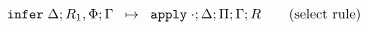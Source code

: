 
\[
\mathtt{infer} \; \Delta; R_1, \Phi; \Gamma \;\; \mapsto \;\; \mathtt{apply} \; \cdot; \Delta; \Pi; \Gamma; R \tag{select rule}
\]
